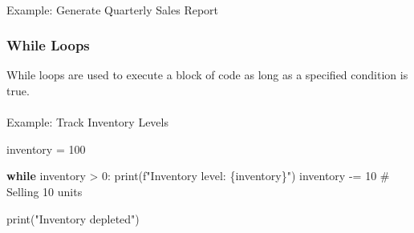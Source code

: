 \documentclass[
  letterpaper,
  DIV=11,
  numbers=noendperiod]{scrreprt}
\makeatletter
\let\oldparagraph\paragraph
\renewcommand{\paragraph}{
    \@ifstar
      \xxxParagraphStar
      \xxxParagraphNoStar
  }
\newcommand{\xxxParagraphStar}[1]{\oldparagraph*{#1}\mbox{}}
\newcommand{\xxxParagraphNoStar}[1]{\oldparagraph{#1}\mbox{}}
\newenvironment{Shaded}{\begin{snugshade}}{\end{snugshade}}
\newcommand{\BuiltInTok}[1]{\textcolor[rgb]{0.00,0.23,0.31}{#1}}
\newcommand{\CommentTok}[1]{\textcolor[rgb]{0.37,0.37,0.37}{#1}}
\newcommand{\ControlFlowTok}[1]{\textcolor[rgb]{0.00,0.23,0.31}{\textbf{#1}}}
\newcommand{\DecValTok}[1]{\textcolor[rgb]{0.68,0.00,0.00}{#1}}
\newcommand{\KeywordTok}[1]{\textcolor[rgb]{0.00,0.23,0.31}{\textbf{#1}}}
\newcommand{\NormalTok}[1]{\textcolor[rgb]{0.00,0.23,0.31}{#1}}
\newcommand{\OperatorTok}[1]{\textcolor[rgb]{0.37,0.37,0.37}{#1}}
\newcommand{\SpecialCharTok}[1]{\textcolor[rgb]{0.37,0.37,0.37}{#1}}
\newcommand{\SpecialStringTok}[1]{\textcolor[rgb]{0.13,0.47,0.30}{#1}}
\newcommand{\StringTok}[1]{\textcolor[rgb]{0.13,0.47,0.30}{#1}}
\makeatother
\begin{document}
\paragraph{Example: Generate Quarterly Sales
Report}\label{example-generate-quarterly-sales-report}

\begin{Shaded}
\end{Shaded}

\subsubsection{While Loops}\label{while-loops}

While loops are used to execute a block of code as long as a specified
condition is true.

\paragraph{Example: Track Inventory
Levels}\label{example-track-inventory-levels}

\begin{Shaded}
\begin{Highlighting}[]
\NormalTok{inventory }\OperatorTok{=} \DecValTok{100}

\ControlFlowTok{while}\NormalTok{ inventory }\OperatorTok{\textgreater{}} \DecValTok{0}\NormalTok{:}
    \BuiltInTok{print}\NormalTok{(}\SpecialStringTok{f"Inventory level: }\SpecialCharTok{\{}\NormalTok{inventory}\SpecialCharTok{\}}\SpecialStringTok{"}\NormalTok{)}
\NormalTok{    inventory }\OperatorTok{{-}=} \DecValTok{10}  \CommentTok{\# Selling 10 units}

\BuiltInTok{print}\NormalTok{(}\StringTok{"Inventory depleted"}\NormalTok{)}
\end{Highlighting}
\end{Shaded}
\end{document}
